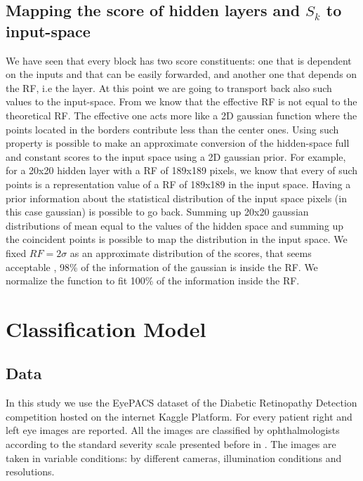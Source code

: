 \documentclass[preprint]{elsarticle}
\theoremstyle{definition} %
\theoremstyle{remark}
\begin{document}
\subsection{Mapping the score of hidden layers and $S_k$ to input-space}\label{sec:mapping-input}

We have seen that every block has two score constituents: one that is dependent on the inputs and that can be easily forwarded, and another one that depends on the RF, i.e the layer. At this point we are going to transport back also such values to the input-space. From \citep{luo2016understanding} we know that the effective RF is not equal to the theoretical RF. The effective one acts more like a 2D gaussian function where the points located in the borders contribute less than the center ones. Using such property is possible to make an approximate conversion of the hidden-space full and constant scores to the input space using a 2D gaussian prior. For example, for a 20x20 hidden layer with a RF of 189x189 pixels, we know that every of such points is a representation value of a RF of 189x189 in the input space. Having a prior information about the statistical distribution of the input space pixels (in this case gaussian) is possible to go back. Summing up 20x20 gaussian distributions of mean equal to the values of the hidden space and summing up the coincident points is possible to map the distribution in the input space. We fixed $RF = 2\sigma$ as an approximate distribution of the scores, that seems acceptable \citep{luo2016understanding},  98\% of the information of the gaussian is inside the RF. We normalize the function to fit 100\% of the information inside the RF.

\section{Classification Model}\label{sec:class}

\subsection{Data}

In this study we use the EyePACS dataset of the Diabetic Retinopathy Detection competition hosted on the internet Kaggle Platform.  For every patient right and left eye images are reported. All the images are classified by ophthalmologists according to the standard severity scale presented before in \cite{diaclass}. The images are taken in variable conditions: by different cameras, illumination conditions and resolutions. 
\end{document}

